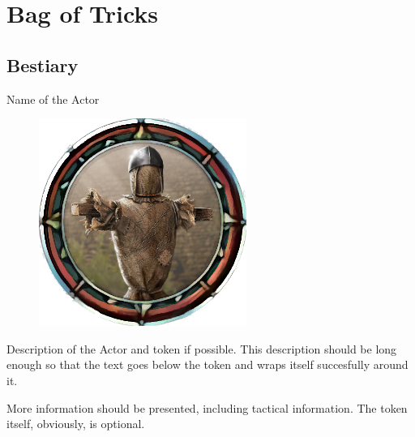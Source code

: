 \chapter{Bag of Tricks}

\label{annex_samples_bestiary}


\section{Bestiary}



\begin{monsterboxbg}{Name of the Actor}

    \begin{figure}
        \includegraphics[width=70bp,height=70bp]{img/boss_token_example.png}
    \end{figure}

    Description of the Actor and token if possible. This description should be long enough so that the text goes below the token and wraps itself succesfully around it.

    More information should be presented, including tactical information. The token itself, obviously, is optional.
    
    \rpghline
    \stats[ %
        STR = \stat{12}, 
        DEX = \stat{7},
        CON = \stat{10},
        INT = \stat{10},
        WIS = \stat{10},
        CHA = \stat{10},
    ]
    \rpghline


\end{monsterboxbg}

